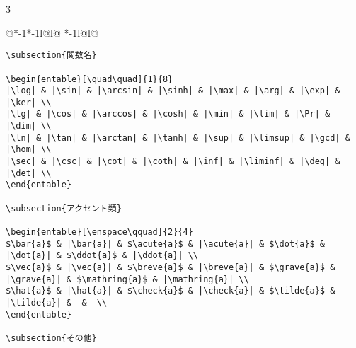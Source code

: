 \documentclass[10pt,a4paper,landscape,dvipdfmx]{jarticle}
\makeatletter
\def\set@etsep#1#2{\def\etcolsep{#1}\def\etitemsep{#2}}
\newenvironment{entable}[3][\quad\qquad]{%
  \set@etsep#1\relax\relax
  \begin{tabular}{%
    @{}*{\the\numexpr#3-1}{*{\the\numexpr#2-1}{l@{\etcolsep}}l@{\etitemsep}}%
    *{\the\numexpr#2-1}{l@{\etcolsep}}l@{}}}{%
  \end{tabular}}
\makeatother
\begin{document}
\begin{multicols}{3}
\begin{entable}[\enspace]{2}{1}
\begin{verbatim}
\subsection{関数名}

\begin{entable}[\quad\quad]{1}{8}
|\log| & |\sin| & |\arcsin| & |\sinh| & |\max| & |\arg| & |\exp| & |\ker| \\
|\lg| & |\cos| & |\arccos| & |\cosh| & |\min| & |\lim| & |\Pr| & |\dim| \\
|\ln| & |\tan| & |\arctan| & |\tanh| & |\sup| & |\limsup| & |\gcd| & |\hom| \\
|\sec| & |\csc| & |\cot| & |\coth| & |\inf| & |\liminf| & |\deg| & |\det| \\
\end{entable}

\subsection{アクセント類}

\begin{entable}[\enspace\qquad]{2}{4}
$\bar{a}$ & |\bar{a}| & $\acute{a}$ & |\acute{a}| & $\dot{a}$ & |\dot{a}| & $\ddot{a}$ & |\ddot{a}| \\
$\vec{a}$ & |\vec{a}| & $\breve{a}$ & |\breve{a}| & $\grave{a}$ & |\grave{a}| & $\mathring{a}$ & |\mathring{a}| \\
$\hat{a}$ & |\hat{a}| & $\check{a}$ & |\check{a}| & $\tilde{a}$ & |\tilde{a}| &  &  \\
\end{entable}

\subsection{その他}


\end{verbatim}
\end{entable}
\end{multicols}
\end{document}
